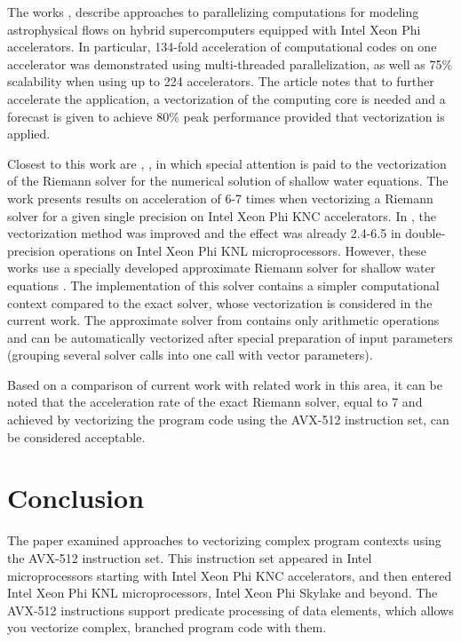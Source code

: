 \documentclass[utf8,english]{psta}%
\begin{document}
The works \cite{Kulikov}, \cite{Kulikov2} describe approaches to parallelizing computations for modeling astrophysical flows on hybrid supercomputers equipped with Intel Xeon Phi accelerators.
In particular, 134-fold acceleration of computational codes on one accelerator was demonstrated using multi-threaded parallelization, as well as 75\% scalability when using up to 224 accelerators.
The article notes that to further accelerate the application, a vectorization of the computing core is needed and a forecast is given to achieve 80\% peak performance provided that vectorization is applied.

Closest to this work are \cite{BaderSWEVect}, \cite{FerreiraSWEVect}, in which special attention is paid to the vectorization of the Riemann solver for the numerical solution of shallow water equations.
The work \cite{BaderSWEVect} presents results on acceleration of 6-7 times when vectorizing a Riemann solver for a given single precision on Intel Xeon Phi KNC accelerators.
In \cite{FerreiraSWEVect}, the vectorization method was improved and the effect was already 2.4-6.5 in double-precision operations on Intel Xeon Phi KNL microprocessors.
However, these works use a specially developed approximate Riemann solver for shallow water equations \cite{George}.
The implementation of this solver contains a simpler computational context compared to the exact solver, whose vectorization is considered in the current work.
The approximate solver from \cite{George} contains only arithmetic operations and can be automatically vectorized after special preparation of input parameters (grouping several solver calls into one call with vector parameters).

Based on a comparison of current work with related work in this area, it can be noted that the acceleration rate of the exact Riemann solver, equal to 7 and achieved by vectorizing the program code using the AVX-512 instruction set, can be considered acceptable.

\section*{Conclusion}

The paper examined approaches to vectorizing complex program contexts using the AVX-512 instruction set.
This instruction set appeared in Intel microprocessors starting with Intel Xeon Phi KNC accelerators, and then entered Intel Xeon Phi KNL microprocessors, Intel Xeon Phi Skylake and beyond.
The AVX-512 instructions support predicate processing of data elements, which allows you vectorize complex, branched program code with them.
\end{document}
